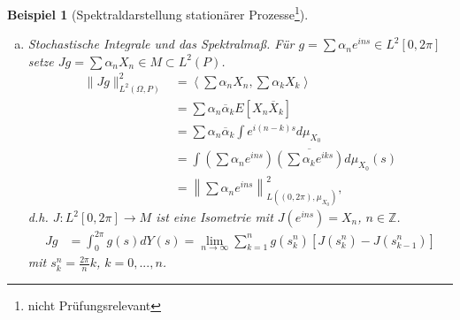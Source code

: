\documentclass[12pt]{extreport} %
\newtheorem{Beispiel}[Satz]{Beispiel}
\numberwithin{equation}{section}
\newcommand{\Z}{\mathbb{Z}} %
\begin{document}
\begin{Beispiel}[Spektraldarstellung stationärer Prozesse\footnote{nicht Prüfungsrelevant}]
\begin{enumerate}[a)]
		wobei $\mu_{X_0}$ das Spektralmaß zu $A$ ist, d.h. $X_0\in M$ \glqq Kovarianzfunktion des stationären Prozesses $(X_n)$\grqq\ ist die Fouriertransformation des Spektralmaßes $\mu_{X_0}$.
		\item Stochastische Integrale und das Spektralmaß. Für $g= \sum \alpha_n e^{ins}\in L^2[0,2\pi]$ setze $Jg = \sum \alpha_n  X_n \in M\subset L^2(P)$.
		\begin{align*}
			\|Jg\|_{L^2(\Omega,P)}^2 &= \left\langle\sum \alpha_n X_n, \sum\alpha_k X_k\right\rangle\\
			&= \sum \alpha_n\overline\alpha_k E[X_n\overline{X}_k]\\
			&= \sum \alpha_n\overline{\alpha}_k\int e^{i(n-k)s}d\mu_{X_0}\\
			&= \int \left(\sum \alpha_n e^{ins} \right)\overline{\left(\sum \alpha_k e^{iks} \right)}d\mu_{X_0}(s) \\
			&= \left\| \sum \alpha_n e^{ins}\right\|_{L((0,2\pi), \mu_{X_0})}^2,
		\end{align*}
		d.h. $J: L^2[0,2\pi]\rightarrow M$ ist eine Isometrie mit $J(e^{ins}) = X_n$, $n\in \Z$.
		\begin{align*}
			Jg &= \int_{0}^{2\pi}g(s) dY(s)
			= \lim\limits_{n\rightarrow\infty} \sum_{k = 1}^{n}g(s_k^n)[J(s_k^n) - J(s_{k-1}^n)]
		\end{align*}
		mit $s_k^n = \frac{2\pi}{n}k$, $k = 0,...,n$.
		\end{enumerate}
	\end{Beispiel}
	
\end{document}
